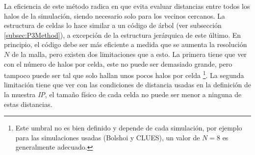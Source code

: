 La eficiencia de este método radica en que evita evaluar distancias entre 
todos los halos de la simulación, siendo necesario solo para los 
vecinos cercanos. La estructura de celdas lo hace similar a un 
código de árbol (ver subsección \ref{subsec:P3Method}), a excepción de la 
estructura jerárquica de este último. En principio, el código debe ser más
eficiente a medida que se aumenta la resolución $N$ de la malla, pero 
existen dos limitaciones que a esto. La primera tiene que ver con el 
número de halos por celda, este no puede ser demasiado grande, pero tampoco 
puede ser tal que solo hallan unos pocos halos por celda \footnote{Este
umbral no es bien definido y depende de cada simulación, por ejemplo para
las simulaciones usadas (Bolshoi y CLUES), un valor de $N=8$ es generalmente 
adecuado.}. La segunda limitación tiene que ver con las condiciones de 
distancia usadas en la definición de la muestra \textit{IP}, el tamaño 
físico de cada celda no puede ser menor a ninguna de estas distancias.


